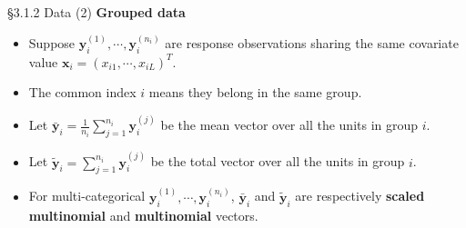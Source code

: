 \documentclass{beamer}
\newenvironment{wideitemize}%
  {\begin{itemize}%
    \setlength{\parskip}{1em}}%
  {\end{itemize}}
\begin{document}
\begin{frame}{\S3.1.2 Data (2)}
\noindent
\textbf{Grouped data}
\begin{wideitemize}
\item
Suppose $\textbf{y}_i^{(1)}, \cdots, \textbf{y}_i^{(n_i)}$ are response observations sharing the same  
covariate value $\textbf{x}_i=(x_{i1},\cdots, x_{iL})^T$. 

\item The common index $i$ means they belong in the same group.
\item
Let $\bar{\textbf{y}}_i=\frac{1}{n_i}\sum_{j=1}^{n_i} \textbf{y}_i^{(j)}$ be the mean vector over
all the units in group $i$.


\item
Let $\tilde{\textbf{y}}_i=\sum_{j=1}^{n_i} \textbf{y}_i^{(j)}$ be the total vector over
all the units in group $i$.

\item For multi-categorical $\textbf{y}_i^{(1)}, \cdots, \textbf{y}_i^{(n_i)}$, $\bar{\textbf{y}}_i$  and $\tilde{\textbf{y}}_i$ are respectively  {\bf scaled multinomial} and  {\bf multinomial} vectors. 


\end{wideitemize}

\end{frame}
\end{document}
